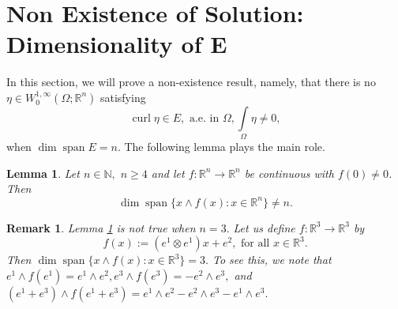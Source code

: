 \documentclass[11pt, a4paper, reqno]{amsart}
\numberwithin{equation}{section}
\newcommand{\spann}{\operatorname{span}}
\newcommand{\curl}{\operatorname{curl}}
\newtheorem{lemma}[theorem]{Lemma}
\newtheorem{remark}[theorem]{Remark}
\begin{document}
\section{Non Existence of Solution: Dimensionality of E}
In this section, we will prove a non-existence result, namely, that there is no $\eta\in W_0^{1,\infty}(\Omega;\mathbb R^n)$ satisfying $$\curl \eta \in E, \textrm{ a.e. in }\Omega, \displaystyle\int\limits_{\Omega}\eta\neq 0,$$ when $\dim \spann E=n.$ The following lemma plays the main role.
\begin{lemma}\label{lemma 1'}
Let $n\in \mathbb N,$ $n\geq 4$ and let $f:\mathbb R^n \to \mathbb R^n$ be continuous  with $f(0)\neq 0$. Then $$\dim \spann \{x\wedge f(x):x\in \mathbb R^n\}\neq n.$$
\end{lemma}
\begin{remark}
    Lemma \ref{lemma 1'} is not true when $n=3.$ Let us define $f:\mathbb R^3 \to \mathbb R^3$ by $$f(x):=(e^1\otimes e^1)x+e^2, \textrm{ for all } x\in \mathbb R^3.$$ Then $\dim \spann \{x\wedge f(x):x\in \mathbb R^3\}=3.$ To see this, we note that $e^1\wedge f(e^1)=e^1\wedge e^2, e^3\wedge f(e^3)=-e^2\wedge e^3,$ and $(e^1+e^3)\wedge f(e^1+e^3)=e^1\wedge e^2-e^2\wedge e^3-e^1\wedge e^3.$ 
\end{remark}
\end{document}
